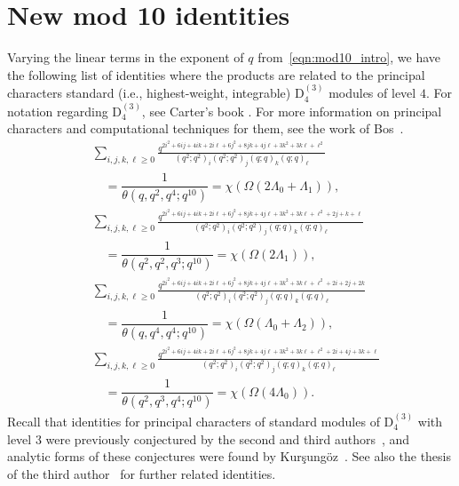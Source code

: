 \section{New mod 10 identities}
\label{sec:mod10}

Varying the linear terms in the exponent of $q$ from~\eqref{eqn:mod10_intro}, we have the following list of identities where the products are related to the
principal characters standard (i.e., highest-weight, integrable) $\mathrm{D}_4^{(3)}$ modules of level $4$.
For notation regarding $\mathrm{D}_4^{(3)}$, see Carter's book \cite[P.\ 608]{Car-book}. 
For more information on principal characters and computational techniques for them, see the work of Bos~\cite{Bos}.
\begin{align}
&\sum_{i,j,k,\ell \ge 0}
\frac{q^{2i^2 + 6 ij + 4ik + 2i\ell + 6j^2 + 8 jk + 4 j\ell + 3k^2+3k\ell+\ell^2}}
{\left(q^2;q^2\right)_i\left(q^2;q^2\right)_j\left(q;q\right)_k\left(q;q\right)_\ell}\nonumber\\
&\quad=
\dfrac{1}{\theta(q,q^2,q^4;q^{10})} 
=\chi(\Omega(2\Lambda_0+\Lambda_1)),
\label{eq:mod10A}
\\
&\sum_{i,j,k,\ell \ge 0}
\frac{q^{2i^2 + 6 ij + 4ik + 2i\ell + 6j^2 + 8 jk + 4 j\ell + 3k^2+3k\ell+\ell^2+2j+k+\ell}}
{\left(q^2;q^2\right)_i\left(q^2;q^2\right)_j\left(q;q\right)_k\left(q;q\right)_\ell}
\nonumber\\ 
&\quad=
\dfrac{1}{\theta(q^2,q^2,q^3;q^{10})}  
=\chi(\Omega(2\Lambda_1)),
\\
&\sum_{i,j,k,\ell \ge 0}
\frac{q^{2i^2 + 6 ij + 4ik + 2i\ell + 6j^2 + 8 jk + 4 j\ell + 3k^2+3k\ell+\ell^2+2i+2j+2k}}
{\left(q^2;q^2\right)_i\left(q^2;q^2\right)_j\left(q;q\right)_k\left(q;q\right)_\ell}
\nonumber\\ 
&\quad= 
\dfrac{1}{\theta(q,q^4,q^4;q^{10})}  
=\chi(\Omega(\Lambda_0+\Lambda_2)),
\\
&\sum_{i,j,k,\ell \ge 0}
\frac{q^{2i^2 + 6 ij + 4ik + 2i\ell + 6j^2 + 8 jk + 4 j\ell + 3k^2+3k\ell+\ell^2+2i+4j+3k+\ell}}
{\left(q^2;q^2\right)_i\left(q^2;q^2\right)_j\left(q;q\right)_k\left(q;q\right)_\ell}
\nonumber\\ 
&\quad=
\dfrac{1}{\theta(q^2,q^3,q^4;q^{10})}   
= \chi(\Omega(4\Lambda_0)). \label{eq:mod10D}
\end{align}
Recall that  identities for principal characters of  standard modules
of $\mathrm{D}_4^{(3)}$ with level $3$ were previously conjectured by the second and third authors~\cite{KanRus-idf}, and
analytic forms of these conjectures were found by Kur\c{s}ung\"{o}z~\cite{Kur-KR}. See also the thesis of the third author~\cite{Rus-thesis} for further
related identities.


